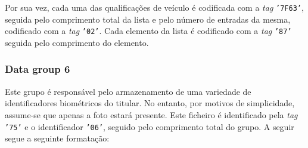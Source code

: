 Por sua vez, cada uma das qualificações de veículo é codificada com a \textit{tag} \texttt{'7F63'}, seguida pelo comprimento total da lista e pelo número de entradas da mesma, codificado com a \textit{tag} \texttt{'02'}. Cada elemento da lista é codificado com a \textit{tag} \texttt{'87'} seguida pelo comprimento do elemento.



\subsubsection{Data group 6}

Este grupo é responsável pelo armazenamento de uma variedade de identificadores biométricos do titular. No entanto, por motivos de simplicidade, assume-se que apenas a foto estará presente. Este ficheiro é identificado pela \textit{tag} \texttt{'75'} e o identificador \texttt{'06'}, seguido pelo comprimento total do grupo. A seguir segue a seguinte formatação:

